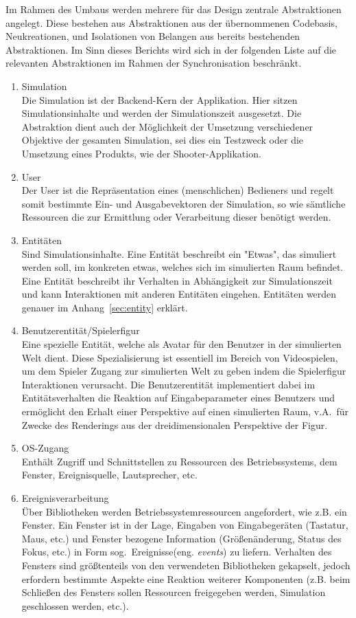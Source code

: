 \documentclass[11pt,twoside,a4paper]{article}
\begin{document}
Im Rahmen des Umbaus werden mehrere für das Design zentrale Abstraktionen angelegt.
Diese bestehen aus Abstraktionen aus der übernommenen Codebasis, Neukreationen, und Isolationen von Belangen aus bereits bestehenden Abstraktionen. Im Sinn dieses Berichts wird sich in der folgenden Liste auf die relevanten Abstraktionen im Rahmen der Synchronisation beschränkt.

\begin{enumerate}
\item Simulation\\
Die Simulation ist der Backend-Kern der Applikation. Hier sitzen Simulationsinhalte und werden der Simulationszeit ausgesetzt. Die Abstraktion dient auch der Möglichkeit der Umsetzung verschiedener Objektive der gesamten Simulation, sei dies ein Testzweck oder die Umsetzung eines Produkts, wie der Shooter-Applikation.
\item User\\
Der User ist die Repräsentation eines (menschlichen) Bedieners und regelt somit bestimmte Ein- und Ausgabevektoren der Simulation, so wie sämtliche Ressourcen die zur Ermittlung oder Verarbeitung dieser benötigt werden.
\item Entitäten\\
Sind Simulationsinhalte. Eine Entität beschreibt ein "Etwas", das simuliert werden soll, im konkreten etwas, welches sich im simulierten Raum befindet. Eine Entität beschreibt ihr Verhalten in Abhängigkeit zur Simulationszeit und kann Interaktionen mit anderen Entitäten eingehen. Entitäten werden genauer im Anhang~\ref{sec:entity} erklärt.
\item Benutzerentität/Spielerfigur\\
Eine spezielle Entität, welche als Avatar für den Benutzer in der simulierten Welt dient. Diese Spezialisierung ist essentiell im Bereich von Videospielen, um dem Spieler Zugang zur simulierten Welt zu geben indem die Spielerfigur Interaktionen verursacht. Die Benutzerentität implementiert dabei im Entitätsverhalten die Reaktion auf Eingabeparameter eines Benutzers und ermöglicht den Erhalt einer Perspektive auf einen simulierten Raum, v.A.~für Zwecke des Renderings aus der dreidimensionalen Perspektive der Figur.
\item OS-Zugang\\
Enthält Zugriff und Schnittstellen zu Ressourcen des Betriebssystems, dem Fenster, Ereignisquelle, Lautsprecher, etc.
\item Ereignisverarbeitung\\
Über Bibliotheken werden Betriebssystemressourcen angefordert, wie z.B. ein Fenster. Ein Fenster ist in der Lage, Eingaben von Eingabegeräten (Tastatur, Maus, etc.) und Fenster bezogene Information (Größenänderung, Status des Fokus, etc.) in Form sog.~Ereignisse(eng. \textit{events}) zu liefern. Verhalten des Fensters sind größtenteils von den verwendeten Bibliotheken gekapselt, jedoch erfordern bestimmte Aspekte eine Reaktion weiterer Komponenten (z.B. beim Schließen des Fensters sollen Ressourcen freigegeben werden, Simulation geschlossen werden, etc.).

\end{enumerate}
\end{document}
